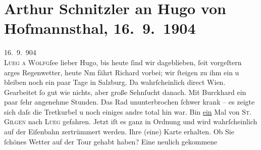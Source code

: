

               \section[Arthur Schnitzler an Hugo von Hofmannsthal, 16. 9. 1904]{ Arthur Schnitzler an Hugo von Hofmannsthal, 16. 9. 1904}\nopagebreak{}\rehead{ }\begin{ledgroupsized}[t]{13cm}\normalsize\beginnumbering{} \toendnotes[C]{\smallbreak\pagebreak[2]} 
\toendnotes[C]{\smallbreak}\pstart
           \raggedleft{}{\pb}16. 9. 904{\\}\textsc{Lueg a Wolfg}ſee\pend
           \pstart
           lieber Hugo, bis heute ſind wir dageblieben, ſeit vorgeſtern arges
               Regenwetter, heute Nm fährt Richard
               vorbei; wir ſteigen zu ihm ein u bleiben noch ein paar Tage in Salzburg. Da{\geminationn} wahrſcheinlich direct
                  Wien. Gearbeitet ſo gut wie nichts, aber große {\pb}Sehnſucht danach. Mit Burckhard ein paar ſehr angenehme Stunden. Das Rad ununterbrochen ſchwer
               krank – es zeigte sich daſs die Tretkurbel u noch einiges andre total hin war. Bin
                  \uline{ein} Mal von \textsc{St. Gilgen} nach \textsc{Lueg} gefahren. Jetzt iſt es ganz in Ordnung und wird wahrſcheinlich auf der
               Eiſenbahn zer{\pb}trümmert werden. Ihre (eine) Karte
               erhalten. Ob Sie ſchönes Wetter auf der Tour gehabt haben? Eine neulich gekommene

\end{ledgroupsized}
